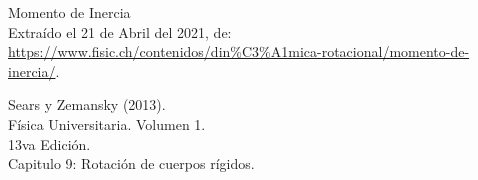 \documentclass[letter,11pt]{article}
\begin{document}
\begin{thebibliography}{99}

 Momento de Inercia \\
Extraído el 21 de Abril del 2021, de: \\
\url{https://www.fisic.ch/contenidos/din%C3%A1mica-rotacional/momento-de-inercia/}.
 
 Sears y Zemansky (2013).\\
Física Universitaria. Volumen 1.\\
13va Edición.\\
Capitulo 9: Rotación de cuerpos rígidos.

\end{thebibliography}
\end{document}
